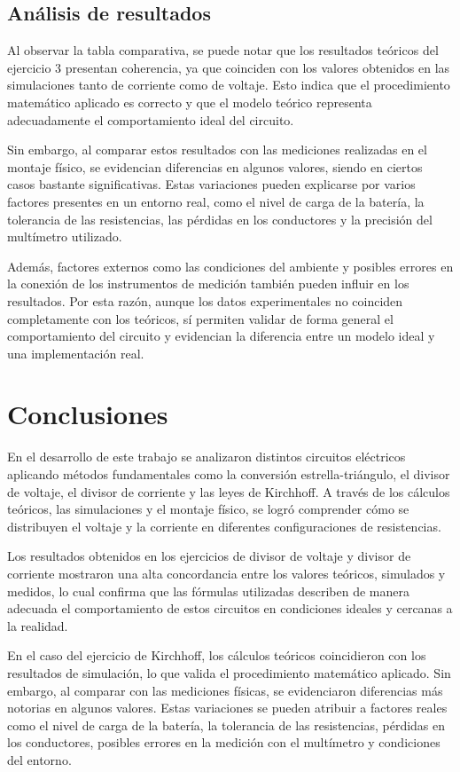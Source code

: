 \documentclass[conference]{IEEEtran}
\begin{document}
\subsection{Análisis de resultados}
Al observar la tabla comparativa, se puede notar que los resultados teóricos del ejercicio 3 
presentan coherencia, ya que coinciden con los valores obtenidos en las simulaciones tanto de 
corriente como de voltaje. Esto indica que el procedimiento matemático aplicado es correcto 
y que el modelo teórico representa adecuadamente el comportamiento ideal del circuito.

Sin embargo, al comparar estos resultados con las mediciones realizadas en el montaje físico, 
se evidencian diferencias en algunos valores, siendo en ciertos casos bastante significativas. 
Estas variaciones pueden explicarse por varios factores presentes en un entorno real, como el 
nivel de carga de la batería, la tolerancia de las resistencias, las pérdidas en los conductores 
y la precisión del multímetro utilizado.

Además, factores externos como las condiciones del ambiente y posibles errores en la conexión 
de los instrumentos de medición también pueden influir en los resultados. Por esta razón, aunque 
los datos experimentales no coinciden completamente con los teóricos, sí permiten validar de 
forma general el comportamiento del circuito y evidencian la diferencia entre un modelo ideal 
y una implementación real.

\section{Conclusiones}
En el desarrollo de este trabajo se analizaron distintos circuitos eléctricos aplicando 
métodos fundamentales como la conversión estrella-triángulo, el divisor de voltaje, 
el divisor de corriente y las leyes de Kirchhoff. A través de los cálculos teóricos, 
las simulaciones y el montaje físico, se logró comprender cómo se distribuyen el 
voltaje y la corriente en diferentes configuraciones de resistencias.

Los resultados obtenidos en los ejercicios de divisor de voltaje y divisor de corriente 
mostraron una alta concordancia entre los valores teóricos, simulados y medidos, lo cual 
confirma que las fórmulas utilizadas describen de manera adecuada el comportamiento de 
estos circuitos en condiciones ideales y cercanas a la realidad.

En el caso del ejercicio de Kirchhoff, los cálculos teóricos coincidieron con los resultados 
de simulación, lo que valida el procedimiento matemático aplicado. Sin embargo, al comparar 
con las mediciones físicas, se evidenciaron diferencias más notorias en algunos valores. 
Estas variaciones se pueden atribuir a factores reales como el nivel de carga de la batería, 
la tolerancia de las resistencias, pérdidas en los conductores, posibles errores en la 
medición con el multímetro y condiciones del entorno.
\end{document}
